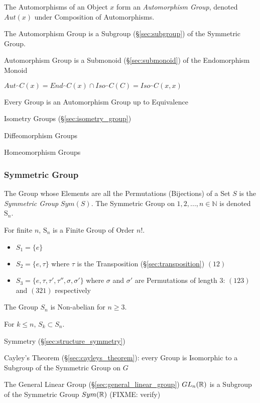 The Automorphisms of an Object $x$ form an \emph{Automorphism Group},
denoted $Aut(x)$ under Composition of Automorphisms.

The Automorphism Group is a Subgroup (\S\ref{sec:subgroup}) of the
Symmetric Group.

Automorphism Group is a Submonoid (\S\ref{sec:submonoid})
of the Endomorphism Monoid %

$Aut_\cat{C}(x) = End_\cat{C}(x) \cap Iso_\cat{C}(C) =
Iso_\cat{C}(x,x)$

Every Group is an Automorphism Group up to Equivalence %

Isometry Groups (\S\ref{sec:isometry_group})

Diffeomorphism Groups %

Homeomorphism Groups %



\subsubsection{Symmetric Group}\label{sec:symmetric_group}

The Group whose Elements are all the Permutations (Bijections) of a
Set $S$ is the \emph{Symmetric Group} $Sym(S)$. The Symmetric Group on
${1, 2, ..., n} \in \mathbb{N}$ is denoted $\mathrm{S}_n$.

For finite $n$, $\mathrm{S}_n$ is a Finite Group of Order $n!$.

\begin{itemize}
    \item $S_1 = \{e\}$
    \item $S_2 = \{e,\tau\}$ where $\tau$ is the Transposition
      (\S\ref{sec:transposition}) $(12)$
    \item $S_3 = \{e, \tau, \tau', \tau'', \sigma, \sigma'\}$ where
      $\sigma$ and $\sigma'$ are Permutations of length 3: $(123)$ and
      $(321)$ respectively
\end{itemize}
The Group $S_n$ is Non-abelian for $n \geq 3$.

For $k \leq n$, $S_k \subset S_n$.

Symmetry (\S\ref{sec:structure_symmetry})

Cayley's Theorem (\S\ref{sec:cayleys_theorem}): every Group is
Isomorphic to a Subgroup of the Symmetric Group on $G$

\fist The General Linear Group (\S\ref{sec:general_linear_group})
$GL_n(\mathbb{R})$ is a Subgroup of the Symmetric Group $Sym(\mathbb{R})$ (FIXME:
verify)

